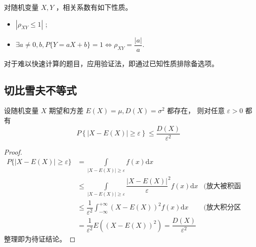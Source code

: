 对随机变量 $ X,Y $ ，相关系数有如下性质。
\begin{itemize}
    \item $ |\rho_{XY} \leq 1| $ ;
    \item $ \exists a\neq0,b,P\{Y = aX+b\} = 1 \Leftrightarrow \rho_{XY} = \dfrac{|a|}{a} $.
\end{itemize}


对于难以快速计算的题目，应用验证法，即通过已知性质排除备选项。

\subsection{切比雪夫不等式}

\begin{Theo}[切比雪夫不等式]

    设随机变量 $ X $ 期望和方差 $ E(X) = \mu,D(X) = \sigma^2 $ 都存在，
    则对任意 $ \varepsilon > 0 $ 都有 $$
        P\left\{|X-E(X)|\geq \varepsilon\right\} \leq \dfrac{D(X)}{\varepsilon^2}
    $$ 
\end{Theo}

\begin{proof}
    \begin{equation*}
        \begin{aligned}
            P\{|X-E(X)|\geq \varepsilon\} &= \int\limits_{|X-E(X)|\geq\varepsilon}f(x)\mathrm{d}x&
            \\&\leq\int\limits_{|X-E(X)|\geq\varepsilon}\dfrac{|X-E(X)|}{\varepsilon}^2f(x)\mathrm{d}x
            &\textrm{(放大被积函数)}\\&\leq
            \dfrac{1}{\varepsilon^2}\int_{-\infty}^{+\infty}(X-E(X))^2f(x)\mathrm{d}x&
            \textrm{(放大积分区间)}\\&=\dfrac{1}{\varepsilon^2}E((X-E(X))^2)
            =\dfrac{D(X)}{\varepsilon^2}
        \end{aligned}
    \end{equation*}
    整理即为待证结论。
\end{proof}
